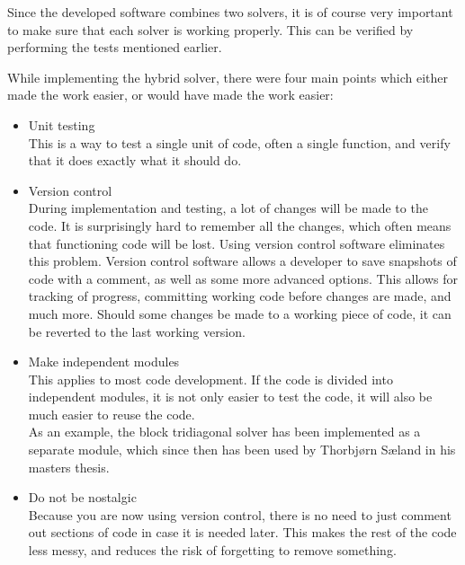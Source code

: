 Since the developed software combines two solvers, it is of course very important to make sure that each solver is working properly. 
This can be verified by performing the tests mentioned earlier. 

While implementing the hybrid solver, there were four main points which either made the work easier, or would have made the work easier:

\begin{itemize}
 \item Unit testing\\
 This is a way to test a single unit of code, often a single function, and verify that it does exactly what it should do. \\
 \item Version control\\
 During implementation and testing, a lot of changes will be made to the code. It is surprisingly hard to remember all the changes, which often means that functioning code will be lost. 
 Using version control software eliminates this problem. Version control software allows a developer to save snapshots of code with a comment, as well as some more advanced options. This allows for tracking of progress, committing working code before changes are made, and much more. Should some changes be made to a working piece of code, it can be reverted to the last working version.\\
 \item Make independent modules\\
 This applies to most code development. If the code is divided into independent modules, it is not only easier to test the code, it will also be much easier to reuse the code. \\
 As an example, the block tridiagonal solver has been implemented as a separate module, which since then has been used by Thorbjørn Sæland in his masters thesis.\\
 \item Do not be nostalgic\\
 Because you are now using version control, there is no need to just comment out sections of code in case it is needed later. 
 This makes the rest of the code less messy, and reduces the risk of forgetting to remove something.
\end{itemize}

